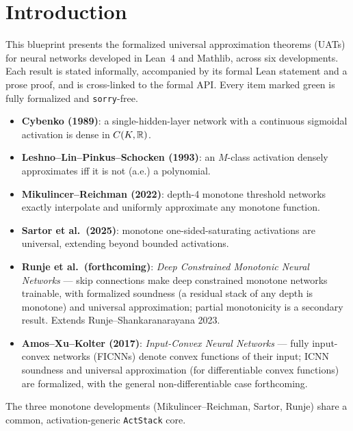 \chapter{Introduction}

This blueprint presents the formalized universal approximation theorems (UATs) for neural networks
developed in Lean~4 and Mathlib, across six developments. Each result is stated informally,
accompanied by its formal Lean statement and a prose proof, and is cross-linked to the formal API.
Every item marked green is fully formalized and \texttt{sorry}-free.

\begin{itemize}
  \item \textbf{Cybenko (1989)}: a single-hidden-layer network with a continuous sigmoidal
    activation is dense in $C(K,\mathbb{R})$.
  \item \textbf{Leshno--Lin--Pinkus--Schocken (1993)}: an $M$-class activation densely
    approximates iff it is not (a.e.) a polynomial.
  \item \textbf{Mikulincer--Reichman (2022)}: depth-4 monotone threshold networks exactly
    interpolate and uniformly approximate any monotone function.
  \item \textbf{Sartor et al.\ (2025)}: monotone one-sided-saturating activations are universal,
    extending beyond bounded activations.
  \item \textbf{Runje et al.\ (forthcoming)}: \emph{Deep Constrained Monotonic Neural Networks} ---
    skip connections make deep constrained monotone networks trainable, with formalized soundness
    (a residual stack of any depth is monotone) and universal approximation; partial monotonicity
    is a secondary result. Extends Runje--Shankaranarayana 2023.
  \item \textbf{Amos--Xu--Kolter (2017)}: \emph{Input-Convex Neural Networks} --- fully
    input-convex networks (FICNNs) denote convex functions of their input; ICNN soundness and
    universal approximation (for differentiable convex functions) are formalized, with the
    general non-differentiable case forthcoming.
\end{itemize}

The three monotone developments (Mikulincer--Reichman, Sartor, Runje) share a common,
activation-generic \texttt{ActStack} core.
